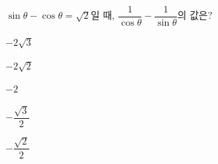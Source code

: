 $\sin\theta-\cos\theta=\sqrt{2}$일 때, $\dfrac{1}{\cos\theta}-\dfrac{1}{\sin\theta}$의 값은?
\begin{choices32}{\rule[-3ex]{0pt}{8ex}$-2\sqrt{3}$}{\rule[-3ex]{0pt}{8ex}$-2\sqrt{2}$}{\rule[-3ex]{0pt}{8ex}$-2$}{\rule[-3ex]{0pt}{8ex}$-\dfrac{\sqrt{3}}{2}$}{\rule[-3ex]{0pt}{8ex}$-\dfrac{\sqrt{2}}{2}$}\end{choices32}
